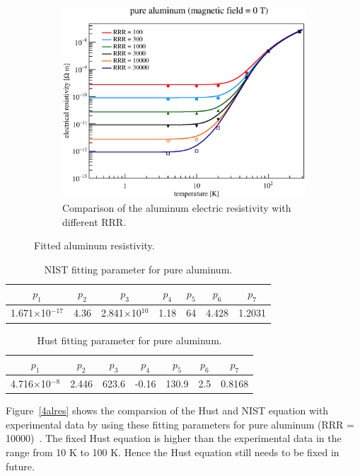 \begin{figure}[H]
\begin{subfigure}{3.1in}
    \includegraphics[scale=0.45]{chapter5/fig/resist.eps}
	\caption{Comparison of the aluminum electric resistivity with different RRR.}
    \label{4alres2}
   \end{subfigure}
   \caption{Fitted aluminum resistivity.}
  \end{figure}

\begin{table}[H]
 \centering
 \begin{tabular}{ccccccc} \hline \hline
  $p_1$ & $p_2$ & $p_3$ & $p_4$ & $p_5$ & $p_6$ & $p_7$ \\ \hline
  1.671$\times$10$^{-17}$ & 4.36 & 2.841$\times$10$^{10}$ & 1.18 & 64 & 4.428 & 1.2031 \\ \hline \hline
 \end{tabular}
 \caption{NIST fitting parameter for pure aluminum.}
 \label{paraAl}
\end{table}
\begin{table}[H]
 \centering
 \begin{tabular}{ccccccc} \hline \hline
  $p_1$ & $p_2$ & $p_3$ & $p_4$ & $p_5$ & $p_6$ & $p_7$ \\ \hline
  4.716$\times$10$^{-8}$ & 2.446 & 623.6 & -0.16 & 130.9 & 2.5 & 0.8168 \\ \hline \hline
 \end{tabular}
 \caption{Hust fitting parameter for pure aluminum.}
 \label{paraAl2}
\end{table}
Figure~\ref{4alres} shows the comparsion of the Hust and NIST equation with experimental data by using these fitting parameters for pure aluminum (RRR = 10000)~\cite{desai}.
The fixed Hust equation is higher than the experimental data in the range from 10 K to 100 K.
Hence the Hust equation still needs to be fixed in future.

